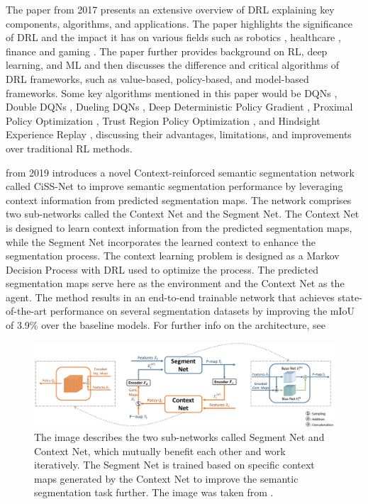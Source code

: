 The paper  \cite{DBLP:journals/corr/Li17b} from 2017 presents an extensive overview of \ac{DRL} explaining key components, algorithms, and applications. The paper highlights the significance of \ac{DRL} and the impact it has on various fields such as robotics \cite{8675643}, healthcare \cite{8031178}, finance \cite{8701368}\cite{https://doi.org/10.48550/arxiv.2011.09607} and gaming \cite{Lample_Chaplot_2017}. The paper further provides background on \ac{RL}, deep learning, and \ac{ML} and then discusses the difference and critical algorithms of \ac{DRL} frameworks, such as value-based, policy-based, and model-based frameworks. Some key algorithms mentioned in this paper would be \acp{DQN} \cite{pmlr-v120-yang20a}, Double \acp{DQN} \cite{van_Hasselt_Guez_Silver_2016}, Dueling \acp{DQN} \cite{pmlr-v48-wangf16}, Deep Deterministic Policy Gradient \cite{DBLP:journals/corr/Casas17}, Proximal Policy Optimization \cite{DBLP:journals/corr/SchulmanWDRK17}, Trust Region Policy Optimization \cite{pmlr-v37-schulman15}, and Hindsight Experience Replay \cite{NIPS2017_453fadbd}, discussing their advantages, limitations, and improvements over traditional \ac{RL} methods.

 \cite{Zhou_2019_CVPR} from 2019 introduces a novel Context-reinforced semantic segmentation network called CiSS-Net to improve semantic segmentation performance by leveraging context information from predicted segmentation maps. The network comprises two sub-networks called the Context Net and the Segment Net. The Context Net is designed to learn context information from the predicted segmentation maps, while the Segment Net incorporates the learned context to enhance the segmentation process. The context learning problem is designed as a Markov Decision Process with \ac{DRL} used to optimize the process. The predicted segmentation maps serve here as the environment and the Context Net as the agent. The method results in an end-to-end trainable network that achieves state-of-the-art performance on several segmentation datasets by improving the mIoU of 3.9\% over the baseline models. For further info on the architecture, see 
\begin{figure}[H]%
    \centering
    \includegraphics[width=\imgWidthXL]{images/context_reinforced_sem_s.png}
    \caption[Context-reinforced Semantic Segmentation]{The image describes the two sub-networks called Segment Net and Context Net, which mutually benefit each other and work iteratively. The Segment Net is trained based on specific context maps generated by the Context Net to improve the semantic segmentation task further. The image was taken from \cite{Zhou_2019_CVPR}.}
    \label{context_reinforced_sem_s}
\end{figure}